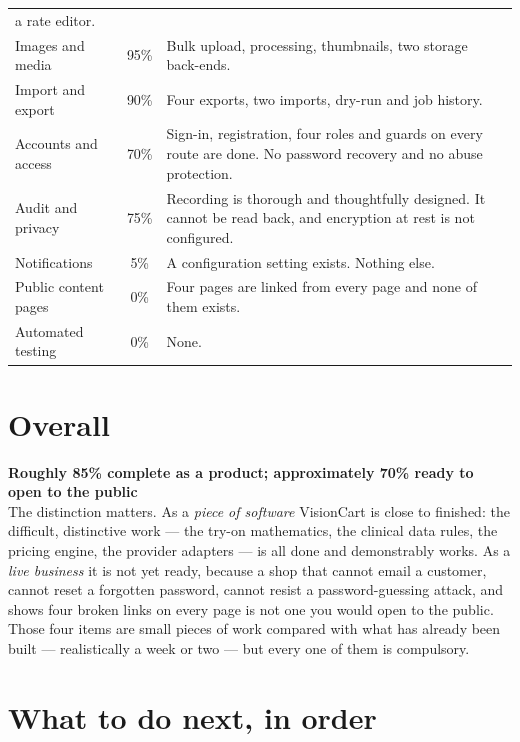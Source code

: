 \documentclass[11pt,a4paper]{report}
\newcommand{\keybox}[2]{%
  \begin{center}
  \begin{minipage}{0.94\textwidth}
  \colorbox{vclight}{\parbox{\dimexpr\textwidth-2\fboxsep}{%
    \vspace{3pt}\textbf{\color{vcblue}#1}\\[3pt]#2\vspace{4pt}}}
  \end{minipage}
  \end{center}}
\begin{document}
\begin{longtable}{@{}p{}c p{}@{}}
a rate editor.\\
\addlinespace
Images and media & 95\% & Bulk upload, processing, thumbnails, two storage
back-ends.\\
\addlinespace
Import and export & 90\% & Four exports, two imports, dry-run and job
history.\\
\addlinespace
Accounts and access & 70\% & Sign-in, registration, four roles and guards on
every route are done. No password recovery and no abuse protection.\\
\addlinespace
Audit and privacy & 75\% & Recording is thorough and thoughtfully designed. It
cannot be read back, and encryption at rest is not configured.\\
\addlinespace
Notifications & 5\% & A configuration setting exists. Nothing else.\\
\addlinespace
Public content pages & 0\% & Four pages are linked from every page and none of
them exists.\\
\addlinespace
Automated testing & 0\% & None.\\
\bottomrule
\end{longtable}

\section{Overall}

\keybox{Roughly 85\% complete as a product; approximately 70\% ready to open
to the public}{The distinction matters. As a \emph{piece of software}
VisionCart is close to finished: the difficult, distinctive work --- the
try-on mathematics, the clinical data rules, the pricing engine, the provider
adapters --- is all done and demonstrably works. As a \emph{live business} it
is not yet ready, because a shop that cannot email a customer, cannot reset a
forgotten password, cannot resist a password-guessing attack, and shows four
broken links on every page is not one you would open to the public. Those four
items are small pieces of work compared with what has already been built ---
realistically a week or two --- but every one of them is compulsory.}

\section{What to do next, in order}
\end{document}
